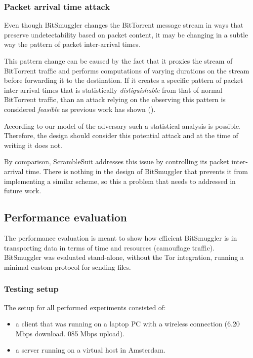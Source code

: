 \documentclass[11pt]{book} %
\newcommand{\projectName}{BitSmuggler }
\begin{document}
\subsubsection{Packet arrival time attack}

Even though \projectName changes the BitTorrent message stream in ways that preserve undetectability based on packet content, it may be changing in a subtle way the pattern of packet inter-arrival times.

This pattern change can be caused by the fact that it proxies the stream of BitTorrent traffic and performs computations of varying durations on the stream before forwarding it to the destination. If it creates a specific pattern of packet inter-arrival times that is statistically  \textit{distiguishable} from that of normal BitTorrent traffic, than an attack relying on the observing this pattern is considered \textit{feasible} as previous work has shown (\citep*{interPacket}).

According to our model of the adversary such a statistical analysis is possible. Therefore, the design should consider this potential attack and at the time of writing it does not.

By comparison, ScrambleSuit \citep*{scrambleSuit} addresses this issue by controlling its packet inter-arrival time. There is nothing in the design of \projectName that prevents it from implementing a similar scheme, so this a problem that needs to addressed in future work.


\subsection{Performance evaluation}

The performance evaluation is meant to show how efficient \projectName is in transporting data in terms of time and resources (camouflage traffic). \projectName was evaluated stand-alone, without the Tor integration, running a minimal custom protocol for sending files.

\subsubsection{Testing setup}

The setup for all performed experiments consisted of:
\begin{itemize}
\item a client that was running on a laptop PC with a wireless connection (6.20 Mbps download. 085 Mbps upload).
\item a server running on a virtual host in Amsterdam.
\end{itemize}
\end{document}
